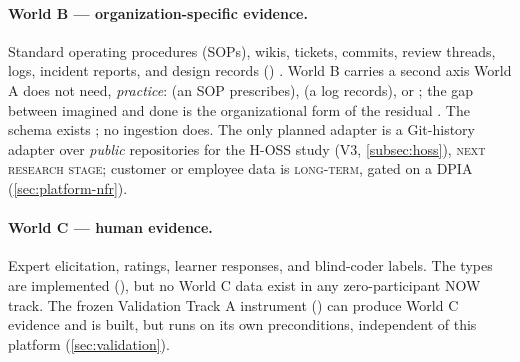 \paragraph{World B --- organization-specific evidence.}
Standard operating procedures (SOPs), wikis, tickets, commits, review threads, logs, incident reports, and design records
() \evobs. World B carries a second axis World A does not
need, \emph{practice}:  (an SOP prescribes),  (a log records), or
; the gap between imagined and done is the organizational form of the residual
\evhyp. The schema exists \evobs; no ingestion does. The only planned adapter is a Git-history
adapter over \emph{public} repositories for the H-OSS study (V3, \cref{subsec:hoss}), \textsc{next research stage}; customer or
employee data is \textsc{long-term}, gated on a DPIA (\cref{sec:platform-nfr}).

\paragraph{World C --- human evidence.}
Expert elicitation, ratings, learner responses, and blind-coder labels. The types are \evobs{}
implemented (), but no World C data exist in any
zero-participant NOW track. The frozen Validation Track A instrument () can
produce World C evidence and is built, but runs on its own preconditions, independent of this
platform (\cref{sec:validation}).

